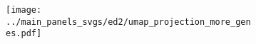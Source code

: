 \documentclass[12pt]{article}
\begin{document}
\begin{figure}[H]
    \begin{subfigure}[t]{1\textwidth}
        \caption{}
        \centering
        \texttt{[image: ../main\_panels\_svgs/ed2/umap\_projection\_more\_genes.pdf]}        
    \end{subfigure}    
\end{figure}
\end{document}

